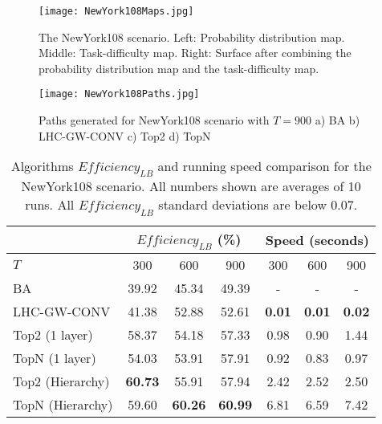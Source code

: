 \begin{figure}
\centering
\texttt{[image: NewYork108Maps.jpg]}
\caption{The NewYork108 scenario. Left: Probability distribution map. Middle: Task-difficulty map. Right: Surface after combining the probability distribution map and the task-difficulty map.}
\label{NewYork108Maps}
\end{figure}
\begin{figure}
\centering
\texttt{[image: NewYork108Paths.jpg]}
\caption{Paths generated for NewYork108 scenario with $T=900$ a) BA b) LHC-GW-CONV c) Top2 d) TopN}
\label{NewYork108Paths}
\end{figure}
\begin{table}
\caption{Algorithms $\mathit{Efficiency_{LB}}$ and running speed comparison for the NewYork108 scenario. All numbers shown are averages of 10 runs. All $\mathit{Efficiency_{LB}}$ standard deviations are below 0.07.}
	\centering
		\begin{tabular}
			{|l|c|c|c|c|c|c|}
			\hline
			 & \multicolumn{3}{|c|}{$\mathit{Efficiency_{LB}}$ (\%)} & \multicolumn{3}{|c|}{Speed (seconds)} \\
			\hline
			$T$ & 300 & 600 & 900	& 300 & 600 & 900 \\
			\hline
			BA & 39.92 & 45.34 & 49.39 & - & - & - \\
			\hline			
			LHC-GW-CONV & 41.38 & 52.88 & 52.61 & \textbf{0.01} & \textbf{0.01} & \textbf{0.02} \\
			\hline			
			Top2 (1 layer)	& 58.37 & 54.18 & 57.33 & 0.98 & 0.90 & 1.44 \\ 
			\hline
			TopN (1 layer)	& 54.03 & 53.91 & 57.91 & 0.92 & 0.83 & 0.97 \\ 
			\hline
			Top2 (Hierarchy) & \textbf{60.73} & 55.91 & 57.94 & 2.42 & 2.52 & 2.50 \\ 
			\hline
			TopN (Hierarchy) & 59.60 & \textbf{60.26} & \textbf{60.99} & 6.81 & 6.59 & 7.42 \\ 
			\hline			
		\end{tabular}
\label{NewYork108}
\end{table}

